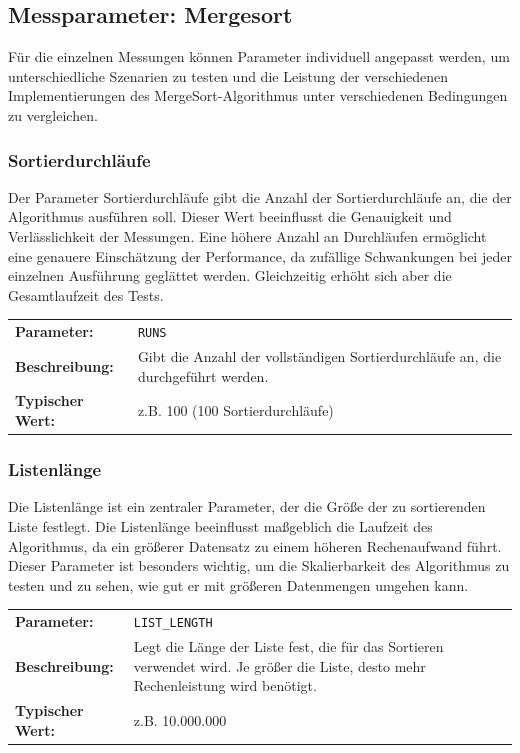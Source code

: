\documentclass[fontsize=12pt,paper=a4,twoside=semi,parskip=half-,headsepline,headinclude]{scrreprt}
\begin{document}
\subsection{Messparameter: Mergesort}
\label{subsec:mergsortpara}

Für die einzelnen Messungen können Parameter individuell angepasst werden, um unterschiedliche Szenarien zu testen und die Leistung der verschiedenen Implementierungen des MergeSort-Algorithmus unter verschiedenen Bedingungen zu 
vergleichen.

\subsubsection{Sortierdurchläufe}

Der Parameter Sortierdurchläufe gibt die Anzahl der Sortierdurchläufe an, die der Algorithmus ausführen soll. Dieser Wert beeinflusst die Genauigkeit und Verlässlichkeit der Messungen. Eine höhere Anzahl an Durchläufen ermöglicht 
eine genauere Einschätzung der Performance, da zufällige Schwankungen bei jeder einzelnen Ausführung geglättet werden. Gleichzeitig erhöht sich aber die Gesamtlaufzeit des Tests.

\begin{tabularx}{\textwidth}{@{}lX@{}}
	\textbf{Parameter:}    & \texttt{RUNS} \\
	\textbf{Beschreibung:} & Gibt die Anzahl der vollständigen Sortierdurchläufe an, die durchgeführt werden. \\
	\textbf{Typischer Wert:} & z.B. 100 (100 Sortierdurchläufe)
\end{tabularx}

\subsubsection{Listenlänge}

Die Listenlänge ist ein zentraler Parameter, der die Größe der zu sortierenden Liste festlegt. Die Listenlänge beeinflusst maßgeblich die Laufzeit des Algorithmus, da ein größerer Datensatz zu einem höheren Rechenaufwand führt. Dieser Parameter ist besonders wichtig, um die Skalierbarkeit des Algorithmus zu testen und zu sehen, wie gut er mit größeren Datenmengen umgehen kann.

\begin{tabularx}{\textwidth}{@{}lX@{}}
	\textbf{Parameter:}    & \texttt{LIST\_LENGTH} \\
	\textbf{Beschreibung:} & Legt die Länge der Liste fest, die für das Sortieren verwendet wird. Je größer die Liste, desto mehr Rechenleistung wird benötigt. \\
	\textbf{Typischer Wert:} & z.B. 10.000.000
\end{tabularx}
\end{document}
